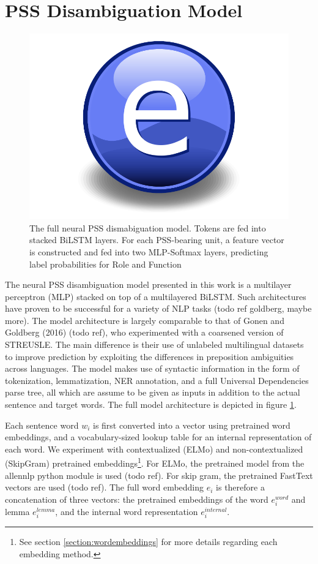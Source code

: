 \section{PSS Disambiguation Model} \label{sec:pssdisambg}

\begin{figure}
    \centering
    \includegraphics{Figures/Electron.pdf}
    \caption{The full neural PSS dismabiguation model. Tokens are fed into stacked BiLSTM layers. For each PSS-bearing unit, a feature vector is constructed and fed into two MLP-Softmax layers, predicting label probabilities for Role and Function}
    \label{fig:pssmodel}
\end{figure}

The neural PSS disambiguation model presented in this work is a multilayer perceptron (MLP) stacked on top of a multilayered BiLSTM. Such architectures have proven to be successful for a variety of NLP tasks (todo ref goldberg, maybe more). The model architecture is largely comparable to that of Gonen and Goldberg (2016) (todo ref), who experimented with a coarsened version of STREUSLE. The main difference is their use of unlabeled multilingual datasets to improve prediction by exploiting the differences in preposition ambiguities across languages. The model makes use of syntactic information in the form of tokenization, lemmatization, NER annotation, and a full Universal Dependencies parse tree, all which are assume to be given as inputs in addition to the actual sentence and target words.  The full model architecture is depicted in figure \ref{fig:pssmodel}. 

Each sentence word $w_i$ is first converted into a vector using pretrained word embeddings, and a vocabulary-sized lookup table for an internal representation of each word. We experiment with contextualized (ELMo) and non-contextualized (SkipGram) pretrained embeddings\footnote{See section \ref{section:wordembeddings} for more details regarding each embedding method.}. For ELMo, the pretrained model from the allennlp python module is used (todo ref). For skip gram, the pretrained FastText vectors are used (todo ref). The full word embedding $e_i$ is therefore a concatenation of three vectors: the pretrained embeddings of the word $e^{word}_i$ and lemma $e^{lemma}_i$, and the internal word representation $e^{internal}_i$. 

